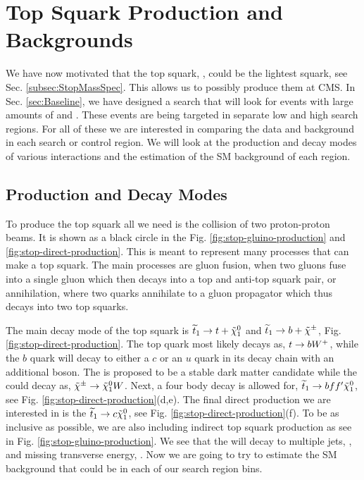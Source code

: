 \chapter{Top Squark Production and Backgrounds}
\label{ch:Search}

We have now motivated that the top squark, \st{}, could be the lightest squark, see Sec. \ref{subsec:StopMassSpec}. This allows us to possibly produce them at CMS. In Sec. \ref{sec:Baseline}, we have designed a search that will look for events with large amounts of \met{} and \nj. These events are being targeted in separate low \dm{} and high \dm{} search regions. For all of these we are interested in comparing the data and background in each search or control region. We will look at the production and decay modes of various \st{} interactions and the estimation of the SM background of each region. 

\section{Production and Decay Modes}
\label{sec:Production}

To produce the top squark all we need is the collision of two proton-proton beams. It is shown as a black circle in the Fig. \ref{fig:stop-gluino-production} and \ref{fig:stop-direct-production}. This is meant to represent many processes that can make a top squark. The main processes are gluon fusion, when two gluons fuse into a single gluon which then decays into a top and anti-top squark pair, or annihilation, where two quarks annihilate to a gluon propagator which thus decays into two top squarks. 



The main decay mode of the top squark is $\widetilde{t}_1\rightarrow t+\tilde{\chi}^{0}_{1}$ and $\widetilde{t}_1\rightarrow b+\tilde{\chi}^{\pm}$, Fig. \ref{fig:stop-direct-production}. The top quark most likely decays as, $t\rightarrow bW^+$, while the $b$ quark will decay to either a $c$ or an $u$ quark in its decay chain with an additional \W{} boson. The \neutralino{} is proposed to be a stable dark matter candidate while the \chargino{} could decay as, $\tilde{\chi}^{\pm}\rightarrow\tilde{\chi}^{0}_{1}W$. Next, a four body decay is allowed for, $\widetilde{t}_1\rightarrow b f f^\prime \tilde{\chi}^{0}_{1}$, see Fig. \ref{fig:stop-direct-production}(d,e). The final direct \st{} production we are interested in is the $\widetilde{t}_1\rightarrow c\tilde{\chi}^{0}_{1}$, see Fig. \ref{fig:stop-direct-production}(f). To be as inclusive as possible, we are also including indirect top squark production as see in Fig. \ref{fig:stop-gluino-production}. We see that the \st{} will decay to multiple jets, \nj, and missing transverse energy, \met. Now we are going to try to estimate the SM background that could be in each of our search region bins.

